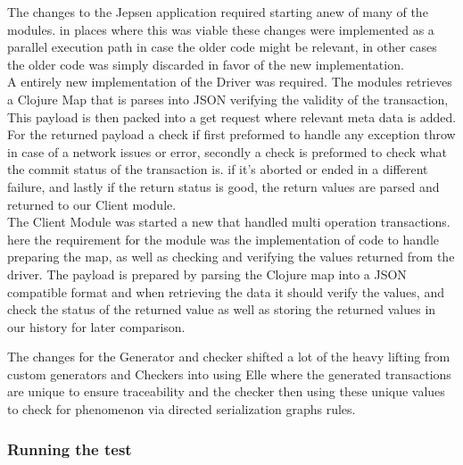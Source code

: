 \documentclass[a4paper,10pt,titlepage]{report}
\begin{document}
The changes to the Jepsen application required starting anew of many of the modules. in places where this was viable these changes were implemented as a parallel execution path in case the older code might be relevant, in other cases the older code was simply discarded in favor of the new implementation.
\\
\vspace{5mm}
A entirely new implementation of the Driver was required. The modules retrieves a Clojure Map that is parses into JSON verifying the validity of the transaction, This payload is then packed into a get request where relevant meta data is added. For the returned payload a check if first preformed to handle any exception throw in case of a network issues or error, secondly a check is preformed to check what the commit status of the transaction is. if it's aborted or ended in a different failure, and lastly if the return status is good, the return values are parsed and returned to our Client module.
\\
\vspace{5mm}
The Client Module was started a new that handled multi operation transactions. here the requirement for the module was the  implementation of code to handle preparing the map,  as well as checking and verifying the values returned from the driver. The payload is prepared by parsing the Clojure map into a JSON compatible format and when retrieving the data it should verify the values, and check the status of the returned value as well as storing the returned values in our history for later comparison.
\\
\vspace{5mm}
    
The changes for the Generator and checker shifted a lot of the heavy lifting from custom generators and Checkers into using Elle where the generated transactions are unique to ensure traceability and the checker then using these unique values to check for phenomenon via directed serialization graphs rules.
\\
\vspace{5mm}

\subsubsection{Running the test}
\end{document}
